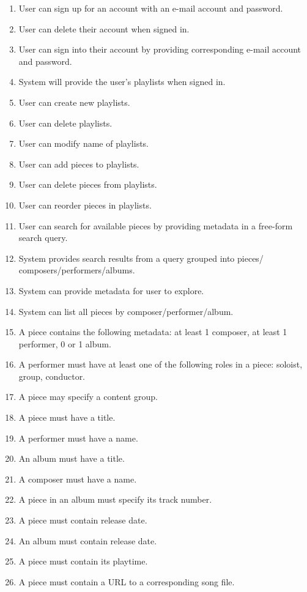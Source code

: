 \begin{enumerate}
    \item User can sign up for an account with an e-mail account and password.
    \item User can delete their account when signed in.
    \item User can sign into their account by providing corresponding e-mail
        account and password.
    \item System will provide the user's playlists when signed in.
    \item User can create new playlists.
    \item User can delete playlists.
    \item User can modify name of playlists.
    \item User can add pieces to playlists.
    \item User can delete pieces from playlists.
    \item User can reorder pieces in playlists.
    \item User can search for available pieces by providing metadata in a
        free-form search query.
    \item System provides search results from a query grouped into pieces/
        composers/performers/albums.
    \item System can provide metadata for user to explore.
    \item System can list all pieces by composer/performer/album.
    \item A piece contains the following metadata: at least 1 composer,
        at least 1 performer, 0 or 1 album.
    \item A performer must have at least one of the following roles in a piece:
        soloist, group, conductor.
    \item A piece may specify a content group.
    \item A piece must have a title.
    \item A performer must have a name. 
    \item An album must have a title.
    \item A composer must have a name.
    \item A piece in an album must specify its track number. %
    \item A piece must contain release date.
    \item An album must contain release date.
    \item A piece must contain its playtime.
    \item A piece must contain a URL to a corresponding song file.
\end{enumerate}
